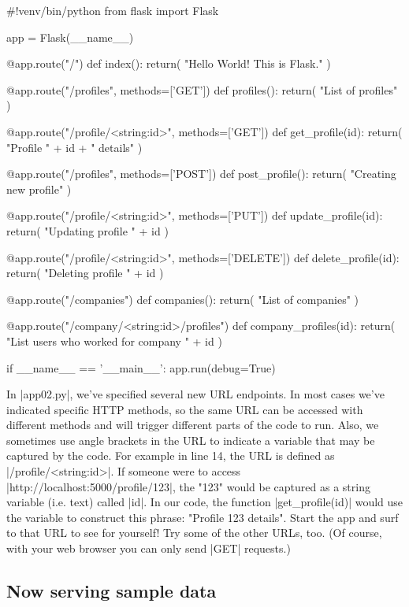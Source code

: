 \documentclass[11pt]{book}
\begin{document}
\begin{pycode}
#!venv/bin/python
from flask import Flask

app = Flask(__name__)

@app.route("/")
def index():
    return( "Hello World! This is Flask." )
    
@app.route("/profiles", methods=['GET'])
def profiles():
    return( "List of profiles" )
    
@app.route("/profile/<string:id>", methods=['GET'])
def get_profile(id):
    return( "Profile " + id + " details" )
    
@app.route("/profiles", methods=['POST'])
def post_profile():
    return( "Creating new profile" )
    
@app.route("/profile/<string:id>", methods=['PUT'])
def update_profile(id):
    return( "Updating profile " + id )
    
@app.route("/profile/<string:id>", methods=['DELETE'])
def delete_profile(id):
    return( "Deleting profile " + id )
    
@app.route("/companies")
def companies():
    return( "List of companies" )
    
@app.route("/company/<string:id>/profiles")
def company_profiles(id):
    return( "List users who worked for company " + id )
    
if __name__ == '__main__':
    app.run(debug=True)
\end{pycode}

In |app02.py|, we've specified several new URL endpoints.  In most cases we've indicated specific HTTP methods, so the same URL can be accessed with different methods and will trigger different parts of the code to run.  Also, we sometimes use angle brackets in the URL to indicate a variable that may be captured by the code.  For example in line 14, the URL is defined as |/profile/<string:id>|.  If someone were to access |http://localhost:5000/profile/123|, the "123" would be captured as a string variable (i.e. text) called |id|.  In our code, the function |get_profile(id)| would use the variable to construct this phrase: "Profile 123 details".  Start the app and surf to that URL to see for yourself!  Try some of the other URLs, too.  (Of course, with your web browser you can only send |GET| requests.)

\subsection*{Now serving sample data}
\end{document}
